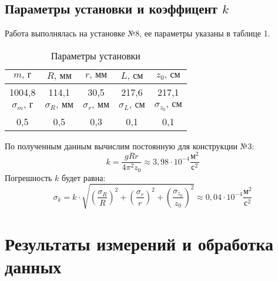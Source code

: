 \documentclass[a4paper,12pt]{article}
\begin{document}
    \subsection*{Параметры установки и коэффицент $k$}
    Работа выполнялась на установке №8, ее параметры указаны в таблице 1.
    \begin{table}[H]
	    \begin{center}
		    \begin{tabular}{|c|c|c|c|c|}
			    \hline
			    $m \text{, г}$  & $R\text{, мм}$ & $r\text{, мм}$ & $L\text{, см}$ & $z_0\text{, см}$\\
			    \hline
			    1004,8 & 114,1 & 30,5 & 217,6 & 217,1\\
			    \hline
			    \hline
			    $\sigma_m \text{, г}$  & $\sigma_R\text{, мм}$ & $\sigma_r\text{, мм}$ & $\sigma_L\text{, см}$ & $\sigma_{z_0}\text{, см}$\\
			    \hline
			    0,5 & 0,5 & 0,3 & 0,1 & 0,1\\
			    \hline 
		    \end{tabular}
	    \caption{Параметры установки}
        \end{center}
	\end{table}
    По полученным данным вычислим постоянную для конструкции №3:
	$$k = \frac{gRr}{4\pi^2z_0} \approx 3,98\cdot 10^{-4} \frac{м^2}{с^2}$$
    Погрешность $k$ будет равна:
	$$\sigma_k = k \cdot \sqrt{\left( \frac{\sigma_R}{R}\right)^2 + \left( \frac{\sigma_r}{r}\right)^2 + \left( \frac{\sigma_{z_0}}{z_0}\right)^2} \approx 0,04 \cdot 10^{-4} \frac{\text{м}^2}{\text{с}^2}$$
	
\section{Результаты измерений и обработка данных}
\end{document}
